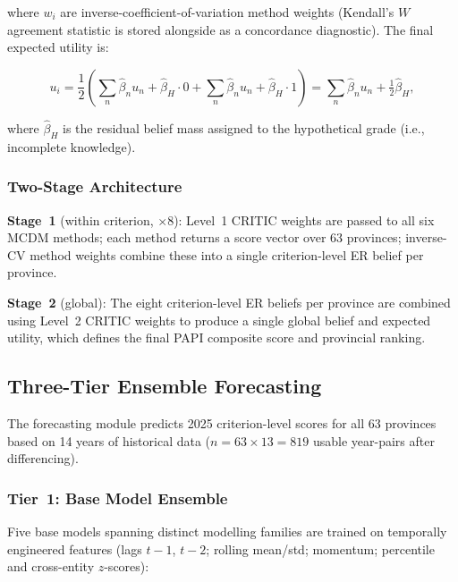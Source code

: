\documentclass[12pt, a4paper]{article}
\begin{document}
where $w_i$ are inverse-coefficient-of-variation method weights (Kendall's $W$
agreement statistic is stored alongside as a concordance diagnostic). The final
expected utility is:

\begin{equation}
  u_i = \frac{1}{2}\left(
    \sum_n \hat{\beta}_n u_n + \hat{\beta}_H \cdot 0
    +
    \sum_n \hat{\beta}_n u_n + \hat{\beta}_H \cdot 1
  \right)
  = \sum_n \hat{\beta}_n u_n + \tfrac{1}{2}\hat{\beta}_H,
  \label{eq:er_utility}
\end{equation}

where $\hat{\beta}_H$ is the residual belief mass assigned to the
hypothetical grade (i.e., incomplete knowledge).

\subsubsection{Two-Stage Architecture}

\textbf{Stage~1} (within criterion, $\times 8$): Level~1 CRITIC weights are passed
to all six MCDM methods; each method returns a score vector over 63 provinces;
inverse-CV method weights combine these into a single criterion-level ER belief
per province.

\textbf{Stage~2} (global): The eight criterion-level ER beliefs per province are
combined using Level~2 CRITIC weights to produce a single global belief and
expected utility, which defines the final PAPI composite score and provincial ranking.

\subsection{Three-Tier Ensemble Forecasting}

The forecasting module predicts 2025 criterion-level scores for all 63 provinces
based on 14 years of historical data ($n = 63 \times 13 = 819$ usable year-pairs
after differencing).

\subsubsection{Tier~1: Base Model Ensemble}

Five base models spanning distinct modelling families are trained on temporally
engineered features (lags $t{-}1$, $t{-}2$; rolling mean/std; momentum;
percentile and cross-entity $z$-scores):
\end{document}
